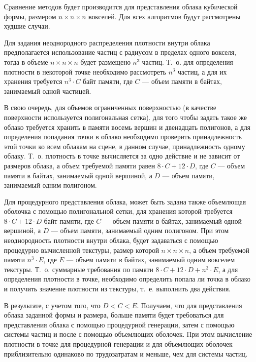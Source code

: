 \label{repr_comp}

Сравнение методов будет производится для представления облака кубической формы, размером $n\times n \times n$ вокселей. Для всех алгоритмов будут рассмотрены худшие случаи. 

Для задания неоднородного распределения плотности внутри облака предполагается использование частиц с радиусом в пределах одного вокселя, тогда в объеме $n\times n \times n$ будет размещено $n^3$ частиц. Т.~о. для определения плотности в некоторой точке необходимо рассмотреть $n^3$ частиц, а для их хранения требуется $n^3 \cdot C$ байт памяти, где $C$ --- объем памяти в байтах, занимаемый одной частицей. 

В свою очередь, для объемов ограниченных поверхностью (в качестве поверхности используется полигональная сетка), для того чтобы задать такое же облако требуется хранить в памяти восемь вершин и двенадцать полигонов, а для определения попадания точки в облако необходимо проверить принадлежность этой точки ко всем облакам на сцене, в данном случае, принадлежность одному облаку. Т.~о. плотность в точке вычисляется за одно действие и не зависит от размеров облака, а объем требуемой памяти равен $8\cdot C + 12 \cdot D$, где $C$ --- объем памяти в байтах, занимаемый одной вершиной, а $D$ --- объем памяти, занимаемый одним полигоном.

Для процедурного представления облака, может быть задана также объемлющая оболочка с помощью полигональной сетки, для хранения которой требуется $8\cdot C + 12 \cdot D$ байт памяти, где $C$ --- объем памяти в байтах, занимаемый одной вершиной, а $D$ --- объем памяти, занимаемый одним полигоном. При этом неоднородность плотности внутри облака, будет задаваться с помощью процедурно вычисленной текстуры, размер которой $n\times n \times n$, а объем требуемой памяти $n^3 \cdot E$, где $E$ --- объем памяти в байтах, занимаемый одним вокселем текстуры. Т.~о. суммарные требования по памяти $8\cdot C + 12 \cdot D + n^3 \cdot E$, а для определения плотности в точке, необходимо определить попала ли точка в облако и получить значение плотности из текстуры, т.~е. выполнить два действия. 

В результате, с учетом того, что $D < C < E$. Получаем, что для представления облака заданной формы и размера, больше памяти будет требоваться для представления облака с помощью процедурной генерации, затем с помощью системы частиц и после с помощью объемлющих оболочек. При этом вычисление плотности в точке для процедурной генерации и для объемлющих оболочек приблизительно одинаково по трудозатратам и меньше, чем для системы частиц.

